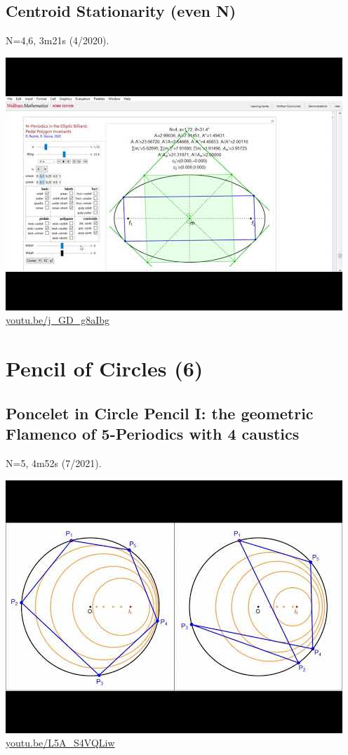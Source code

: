 \documentclass[12pt]{amsart}
\begin{document}
\subsection{Centroid Stationarity (even N)}
\label{vid:j_GD_g8aIbg}
\noindent N=4,6, 3m21s (4/2020). 
\begin{center}\includegraphics[width=.5\textwidth]{pics/j_GD_g8aIbg.jpg} \\ 
\href{https://youtu.be/j_GD_g8aIbg}{\url{youtu.be/j\_GD\_g8aIbg}}\end{center}
% 


\section{Pencil of Circles (6)}

\subsection{Poncelet in Circle Pencil I: the geometric Flamenco of 5-Periodics with 4 caustics}
\label{vid:L5A_S4VQLiw}
\noindent N=5, 4m52s (7/2021). 
\begin{center}\includegraphics[width=.5\textwidth]{pics/L5A_S4VQLiw.jpg} \\ 
\href{https://youtu.be/L5A_S4VQLiw}{\url{youtu.be/L5A\_S4VQLiw}}\end{center}
% 
\end{document}
